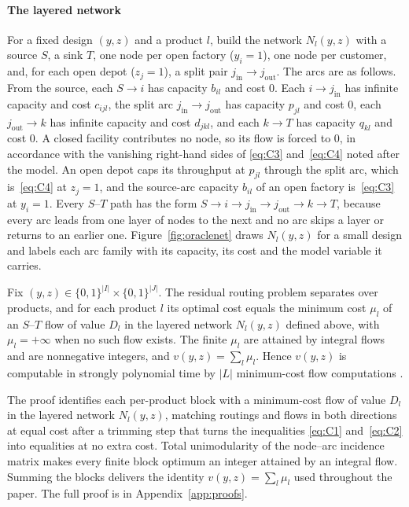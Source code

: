 \paragraph{The layered network} For a fixed design $(y,z)$ and a product
$l$, build the network $N_l(y,z)$ with a source $S$, a sink $T$, one node
per open factory ($y_i=1$), one node per customer, and, for each open
depot ($z_j=1$), a split pair $j_{\mathrm{in}}\!\to\! j_{\mathrm{out}}$.
The arcs are as follows. From the source, each $S\!\to\! i$ has capacity
$b_{il}$ and cost $0$. Each $i\!\to\! j_{\mathrm{in}}$ has infinite
capacity and cost $c_{ijl}$, the split arc
$j_{\mathrm{in}}\!\to\! j_{\mathrm{out}}$ has capacity $p_{jl}$ and cost
$0$, each $j_{\mathrm{out}}\!\to\! k$ has infinite capacity and cost
$d_{jkl}$, and each $k\!\to\! T$ has capacity $q_{kl}$ and cost $0$. A
closed facility contributes no node, so its flow is forced to $0$, in
accordance with the vanishing right-hand sides of \eqref{eq:C3}
and~\eqref{eq:C4} noted after the model. An open depot caps its throughput at $p_{jl}$
through the split arc, which is~\eqref{eq:C4} at $z_j=1$, and the
source-arc capacity $b_{il}$ of an open factory is~\eqref{eq:C3} at
$y_i=1$. Every $S$--$T$ path has the form
$S\!\to\! i\!\to\! j_{\mathrm{in}}\!\to\! j_{\mathrm{out}}\!\to\! k\!\to\!
T$, because every arc leads from one layer of nodes to the next and no
arc skips a layer or returns to an earlier one.
Figure~\ref{fig:oraclenet} draws $N_l(y,z)$ for a small design and
labels each arc family with its capacity, its cost and the model
variable it carries.



\begin{proposition}\label{prop:oracle}
Fix $(y,z)\in\{0,1\}^{|I|}\times\{0,1\}^{|J|}$. The residual routing problem
separates over products, and for each product $l$ its optimal cost equals
the minimum cost $\mu_l$ of an $S$--$T$ flow of value $D_l$ in the layered
network $N_l(y,z)$ defined above, with $\mu_l=+\infty$ when no such flow
exists. The finite $\mu_l$ are attained by integral flows and are
nonnegative integers, and $v(y,z)=\sum_l\mu_l$. Hence $v(y,z)$ is
computable in strongly polynomial time by $|L|$ minimum-cost flow
computations \citep{Orlin1993}.
\end{proposition}
The proof identifies each per-product block with a minimum-cost flow of
value $D_l$ in the layered network $N_l(y,z)$, matching routings and
flows in both directions at equal cost after a trimming step that turns
the inequalities \eqref{eq:C1} and~\eqref{eq:C2} into equalities at no
extra cost. Total unimodularity of the
node--arc incidence matrix makes every finite block optimum an integer
attained by an integral flow. Summing the blocks delivers the identity
$v(y,z)=\sum_l\mu_l$ used throughout the paper. The full proof is in
Appendix~\ref{app:proofs}.

